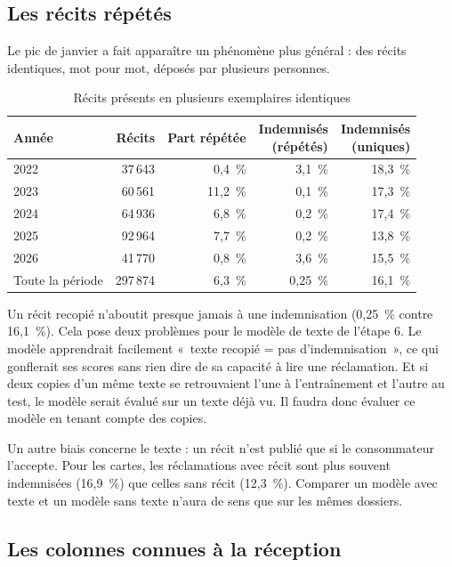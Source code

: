 \documentclass[11pt,a4paper]{article}
\begin{document}
\subsection{Les récits répétés}

Le pic de janvier a fait apparaître un phénomène plus général : des récits identiques, mot pour mot, déposés par plusieurs personnes.

\begin{table}[H]
\centering\small
\begin{tabular}{@{}l r r r r@{}}
\toprule
Année & Récits & Part répétée & \shortstack[r]{Indemnisés\\(répétés)} & \shortstack[r]{Indemnisés\\(uniques)} \\
\midrule
2022 & 37\,643 & 0,4~\% & 3,1~\% & 18,3~\% \\
2023 & 60\,561 & 11,2~\% & 0,1~\% & 17,3~\% \\
2024 & 64\,936 & 6,8~\% & 0,2~\% & 17,4~\% \\
2025 & 92\,964 & 7,7~\% & 0,2~\% & 13,8~\% \\
2026 & 41\,770 & 0,8~\% & 3,6~\% & 15,5~\% \\
\midrule
Toute la période & 297\,874 & 6,3~\% & 0,25~\% & 16,1~\% \\
\bottomrule
\end{tabular}
\caption{Récits présents en plusieurs exemplaires identiques}
\end{table}

Un récit recopié n'aboutit presque jamais à une indemnisation (0,25~\% contre 16,1~\%). Cela pose deux problèmes pour le modèle de texte de l'étape 6. Le modèle apprendrait facilement «~texte recopié = pas d'indemnisation~», ce qui gonflerait ses scores sans rien dire de sa capacité à lire une réclamation. Et si deux copies d'un même texte se retrouvaient l'une à l'entraînement et l'autre au test, le modèle serait évalué sur un texte déjà vu. Il faudra donc évaluer ce modèle en tenant compte des copies.

Un autre biais concerne le texte : un récit n'est publié que si le consommateur l'accepte. Pour les cartes, les réclamations avec récit sont plus souvent indemnisées (16,9~\%) que celles sans récit (12,3~\%). Comparer un modèle avec texte et un modèle sans texte n'aura de sens que sur les mêmes dossiers.

\subsection{Les colonnes connues à la réception}
\end{document}
